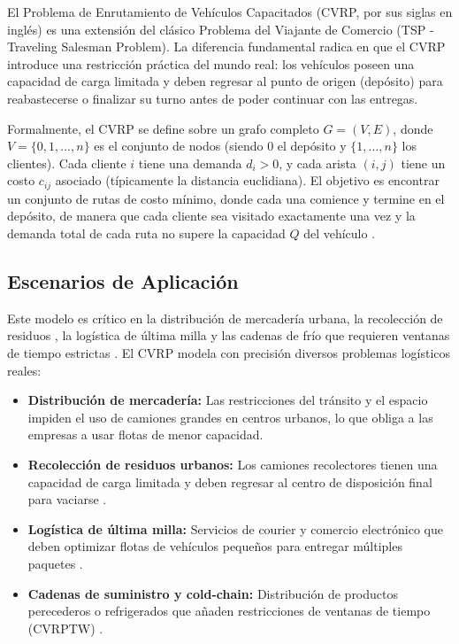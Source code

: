 \documentclass[a4paper, 11pt]{article}
\begin{document}
El Problema de Enrutamiento de Vehículos Capacitados (CVRP, por sus siglas en inglés) es una extensión del clásico Problema del Viajante de Comercio (TSP - Traveling Salesman Problem). La diferencia fundamental radica en que el CVRP introduce una restricción práctica del mundo real: los vehículos poseen una capacidad de carga limitada y deben regresar al punto de origen (depósito) para reabastecerse o finalizar su turno antes de poder continuar con las entregas. 

Formalmente, el CVRP se define sobre un grafo completo $G=(V,E)$, donde $V=\{0,1,...,n\}$ es el conjunto de nodos (siendo 0 el depósito y $\{1,...,n\}$ los clientes). Cada cliente $i$ tiene una demanda $d_i>0$, y cada arista $(i, j)$ tiene un costo $c_{ij}$ asociado (típicamente la distancia euclidiana). El objetivo es encontrar un conjunto de rutas de costo mínimo, donde cada una comience y termine en el depósito, de manera que cada cliente sea visitado exactamente una vez y la demanda total de cada ruta no supere la capacidad $Q$ del vehículo \cite{ref1}.

\subsection{Escenarios de Aplicación}
Este modelo es crítico en la distribución de mercadería urbana, la recolección de residuos \cite{ref2}, la logística de última milla \cite{ref3} y las cadenas de frío que requieren ventanas de tiempo estrictas \cite{ref4}. El CVRP modela con precisión diversos problemas logísticos reales:

\begin{itemize}
    \item \textbf{Distribución de mercadería:} Las restricciones del tránsito y el espacio impiden el uso de camiones grandes en centros urbanos, lo que obliga a las empresas a usar flotas de menor capacidad. 
    \item \textbf{Recolección de residuos urbanos:} Los camiones recolectores tienen una capacidad de carga limitada y deben regresar al centro de disposición final para vaciarse \cite{ref2}.
    \item \textbf{Logística de última milla:} Servicios de courier y comercio electrónico que deben optimizar flotas de vehículos pequeños para entregar múltiples paquetes \cite{ref3}.
    \item \textbf{Cadenas de suministro y cold-chain:} Distribución de productos perecederos o refrigerados que añaden restricciones de ventanas de tiempo (CVRPTW) \cite{ref4}.
\end{itemize}
\end{document}
